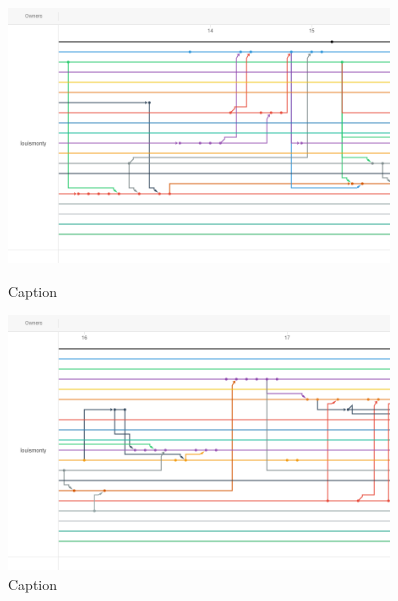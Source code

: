 \begin{figure}
    \includegraphics[width=0.9\textwidth]{Report/root/3.png}
    \caption{Caption}
    \includegraphics[width=0.9\textwidth]{Report/root/4.png}
    \caption{Caption}
    \end{figure}
